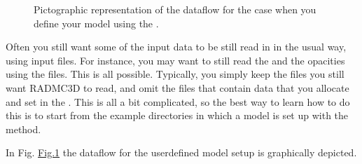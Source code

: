 \documentclass[letterpaper,10pt,english]{sphinxmanual}
\begin{document}
\begin{figure}[htbp]
\centering
\capstart

\noindent{}
\caption{Pictographic representation of the dataflow for the case when you define your
model  using the .}\label{\detokenize{internalsetup:id1}}\label{\detokenize{internalsetup:fig-dataflow-basic-userdef}}\end{figure}

Often you still want some of the input data to be still read in in the usual
way, using input files. For instance, you may want to still read the
 and the opacities using the  files. This
is all possible. Typically, you simply keep the files you still want RADMC\sphinxhyphen{}3D to
read, and omit the files that contain data that you allocate and set in the
. This is all a bit complicated, so the best way to
learn how to do this is to start from the example directories in which a model
is set up with the  method.

In Fig. \hyperref[\detokenize{internalsetup:fig-dataflow-basic-userdef}]{Fig.\@ \ref{\detokenize{internalsetup:fig-dataflow-basic-userdef}}} the dataflow for the user\sphinxhyphen{}defined
model setup is graphically depicted.
\end{document}
